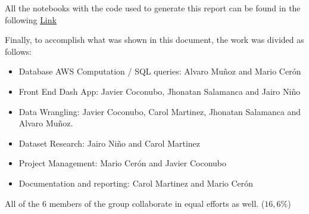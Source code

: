 All the notebooks with the code used to generate this report can be found in the following 
\href{https://github.com/jssalamanca1967/ds4a_datathon_group03}{Link}

Finally, to accomplish what was shown in this document, the work was divided as follows:

\begin{itemize}

\item Database AWS Computation / SQL queries: Alvaro Mu\~noz and Mario Cer\'on
\item Front End Dash App: Javier Coconubo, Jhonatan Salamanca and Jairo Ni\~no
\item Data Wrangling: Javier Coconubo, Carol Martinez, Jhonatan Salamanca and Alvaro Mu\~noz.
\item Dataset Research: Jairo Ni\~no and Carol Martinez
\item Project Management: Mario Cer\'on and Javier Coconubo
\item Documentation and reporting: Carol Martinez and Mario Cer\'on

\end{itemize}

All of the 6 members of the group collaborate in equal efforts as well. ($16,6\%$) 
